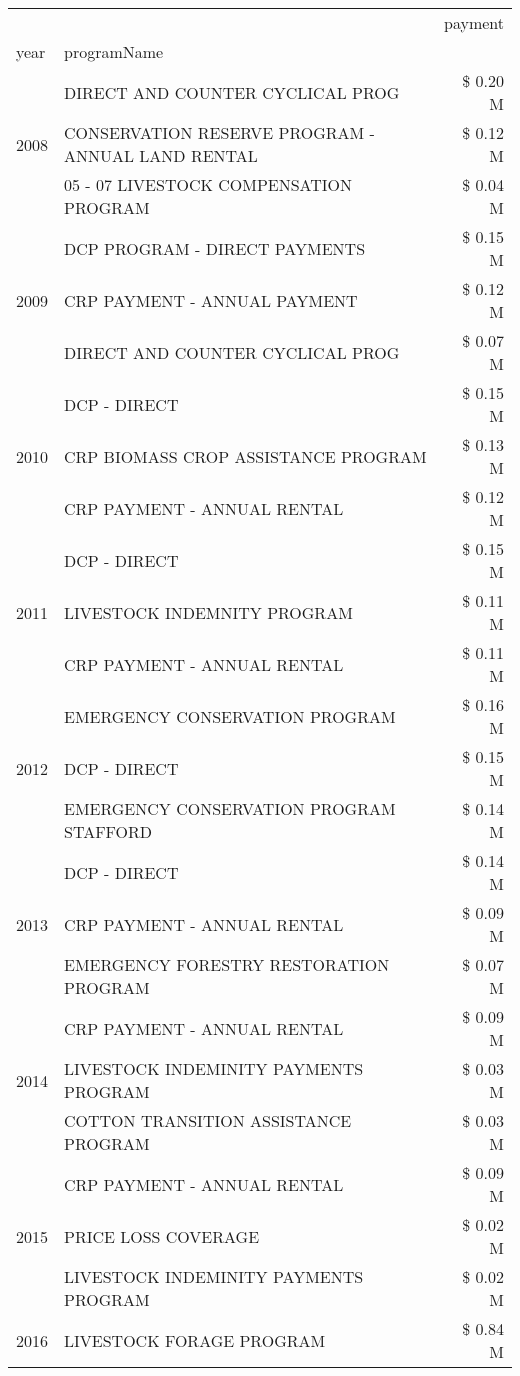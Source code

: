 \begin{tabular}{llr}
\toprule
 &  & payment \\
year & programName &  \\
\midrule
\multirow[t]{3}{*}{2008} & DIRECT AND COUNTER CYCLICAL PROG & \$ 0.20 M \\
 & CONSERVATION RESERVE PROGRAM - ANNUAL LAND RENTAL & \$ 0.12 M \\
 & 05 - 07 LIVESTOCK COMPENSATION PROGRAM & \$ 0.04 M \\
\cline{1-3}
\multirow[t]{3}{*}{2009} & DCP PROGRAM - DIRECT PAYMENTS & \$ 0.15 M \\
 & CRP PAYMENT - ANNUAL PAYMENT & \$ 0.12 M \\
 & DIRECT AND COUNTER CYCLICAL PROG & \$ 0.07 M \\
\cline{1-3}
\multirow[t]{3}{*}{2010} & DCP - DIRECT & \$ 0.15 M \\
 & CRP BIOMASS CROP ASSISTANCE PROGRAM & \$ 0.13 M \\
 & CRP PAYMENT - ANNUAL RENTAL & \$ 0.12 M \\
\cline{1-3}
\multirow[t]{3}{*}{2011} & DCP - DIRECT & \$ 0.15 M \\
 & LIVESTOCK INDEMNITY PROGRAM & \$ 0.11 M \\
 & CRP PAYMENT - ANNUAL RENTAL & \$ 0.11 M \\
\cline{1-3}
\multirow[t]{3}{*}{2012} & EMERGENCY CONSERVATION PROGRAM & \$ 0.16 M \\
 & DCP - DIRECT & \$ 0.15 M \\
 & EMERGENCY CONSERVATION PROGRAM STAFFORD & \$ 0.14 M \\
\cline{1-3}
\multirow[t]{3}{*}{2013} & DCP - DIRECT & \$ 0.14 M \\
 & CRP PAYMENT - ANNUAL RENTAL & \$ 0.09 M \\
 & EMERGENCY FORESTRY RESTORATION PROGRAM & \$ 0.07 M \\
\cline{1-3}
\multirow[t]{3}{*}{2014} & CRP PAYMENT - ANNUAL RENTAL & \$ 0.09 M \\
 & LIVESTOCK INDEMINITY PAYMENTS PROGRAM & \$ 0.03 M \\
 & COTTON TRANSITION ASSISTANCE PROGRAM & \$ 0.03 M \\
\cline{1-3}
\multirow[t]{3}{*}{2015} & CRP PAYMENT - ANNUAL RENTAL & \$ 0.09 M \\
 & PRICE LOSS COVERAGE & \$ 0.02 M \\
 & LIVESTOCK INDEMINITY PAYMENTS PROGRAM & \$ 0.02 M \\
\cline{1-3}
\multirow[t]{3}{*}{2016} & LIVESTOCK FORAGE PROGRAM & \$ 0.84 M \\

\end{tabular}
